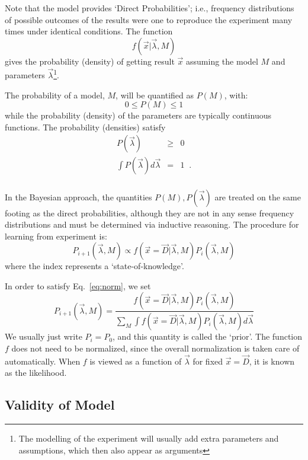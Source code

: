 \documentclass[11pt, a4paper]{article}
\begin{document}
Note that the model provides `Direct Probabilities'; i.e., frequency
distributions of possible outcomes of the results were one to
reproduce the experiment many times under identical conditions.  The
function
%
\begin{equation}
f(\vec{x}|\vec{\lambda},M)
\end{equation}
%
gives the probability (density) of getting result $\vec{x}$ assuming
the model $M$ and parameters $\vec{\lambda}$\footnote{The modelling of
the experiment will usually add extra parameters and assumptions,
which then also appear as arguments}.

The probability of a model, $M$, will be quantified as $P(M)$, with:
%
\begin{equation}
\label{eq:norm}
0 \leq P(M) \leq 1
\end{equation}
%
while the probability (density) of the parameters are typically
continuous functions.  The probability (densities) satisfy
%
\begin{eqnarray*}
P(\vec{\lambda}) & \ge & 0 \\
\int P(\vec{\lambda}) d\vec{\lambda} &=&1 \;\; .\\
\end{eqnarray*}

In the Bayesian approach, the quantities $P(M), P(\vec{\lambda})$ are
treated on the same footing as the direct probabilities, although they
are not in any sense frequency distributions and must be determined
via inductive reasoning.  The procedure for learning from experiment
is:
%
\begin{equation}
P_{i+1}(\vec{\lambda},M) \propto f(\vec{x}=\vec{D}|\vec{\lambda},M) P_{i}(\vec{\lambda},M) 
\end{equation}
%
where the index represents a `state-of-knowledge'.  

In order to satisfy Eq.~\ref{eq:norm}, we set
%
\begin{equation}
P_{i+1}(\vec{\lambda},M) =\frac{f(\vec{x}=\vec{D}|\vec{\lambda},M) P_{i}(\vec{\lambda},M)}
{\sum_M \int f(\vec{x}=\vec{D}|\vec{\lambda},M) P_{i}(\vec{\lambda},M) d{\vec{\lambda}}}
\end{equation}
%
We usually just write $P_i=P_0$, and this quantity is called the
`prior'.  The function $f$ does not need to be normalized, since the
overall normalization is taken care of automatically.  When $f$ is
viewed as a function of $\vec{\lambda}$ for fixed $\vec{x}=\vec{D}$,
it is known as the likelihood.

\subsection{Validity of Model}
\end{document}

